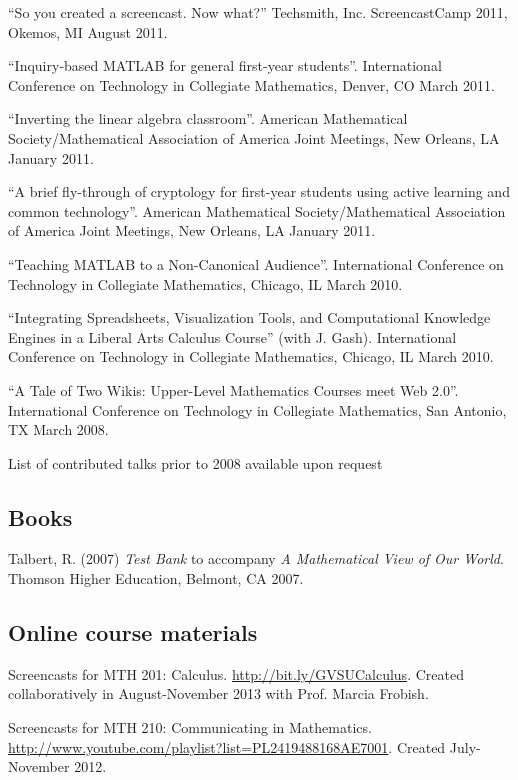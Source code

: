 \documentclass[letterpaper]{article}
\renewenvironment{itemize}{
  \begin{list}{}{
    \setlength{\leftmargin}{1.5em}
	\setlength{\itemsep}{0in}
  }
}{
  \end{list}
}
\begin{document}
\begin{itemize}
	\item ``So you created a screencast. Now what?'' Techsmith, Inc. ScreencastCamp 2011, Okemos, MI August 2011. 
	\item ``Inquiry-based MATLAB for general first-year students''. International Conference on Technology in Collegiate Mathematics, Denver, CO March 2011. 
	\item ``Inverting the linear algebra classroom''. American Mathematical Society/Mathematical Association of America Joint Meetings, New Orleans, LA January 2011.
	\item ``A brief fly-through of cryptology for first-year students using active learning and common technology''.   American Mathematical Society/Mathematical Association of America Joint Meetings, New Orleans, LA January 2011.
	\item ``Teaching MATLAB to a Non-Canonical Audience''. International Conference on Technology in Collegiate Mathematics, Chicago, IL March 2010. 
	\item ``Integrating Spreadsheets, Visualization Tools, and Computational Knowledge Engines in a Liberal Arts Calculus Course'' (with J. Gash). International Conference on Technology in Collegiate Mathematics, Chicago, IL March 2010.
	\item ``A Tale of Two Wikis: Upper-Level Mathematics Courses meet Web 2.0''. International Conference on Technology in Collegiate Mathematics, San Antonio, TX March 2008.
\end{itemize}

\begin{center}
  \begin{footnotesize}
    List of contributed talks prior to 2008 available upon request
  \end{footnotesize}
\end{center}

\subsection*{Books}
\begin{itemize}
	\item Talbert, R. (2007) \emph{Test Bank} to accompany \emph{A Mathematical View of Our World}. Thomson Higher Education, Belmont, CA 2007.
\end{itemize}

\subsection*{Online course materials}
\begin{itemize}
	\item Screencasts for MTH 201: Calculus. \url{http://bit.ly/GVSUCalculus}. Created collaboratively in August-November 2013 with Prof. Marcia Frobish. 
	\item Screencasts for MTH 210: Communicating in Mathematics. \url{http://www.youtube.com/playlist?list=PL2419488168AE7001}. Created July-November 2012. 
\end{itemize}
\end{document}
